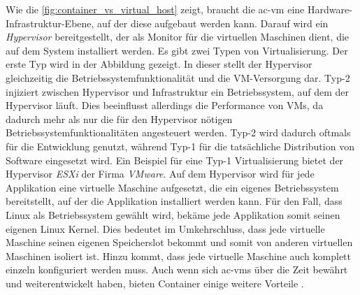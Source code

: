 Wie die \autoref{fig:container_vs_virtual_host} zeigt, braucht die \gls{ac-vm} eine Hardware-Infrastruktur-Ebene, auf der diese aufgebaut werden kann. Darauf wird ein \emph{Hypervisor} bereitgestellt, der als Monitor für die virtuellen Maschinen dient, die auf dem System installiert werden. Es gibt zwei Typen von Virtualisierung. Der erste Typ wird in der Abbildung gezeigt. In dieser stellt der Hypervisor gleichzeitig die Betriebssystemfunktionalität und die VM-Versorgung dar. Typ-2 injiziert zwischen Hypervisor und Infrastruktur ein Betriebssystem, auf dem der Hypervisor läuft. Dies beeinflusst allerdings die Performance von VMs, da dadurch mehr als nur die für den Hypervisor nötigen Betriebssystemfunktionalitäten angesteuert werden. Typ-2 wird dadurch oftmals für die Entwicklung genutzt, während Typ-1 für die tatsächliche Distribution von Software eingesetzt wird. Ein Beispiel für eine Typ-1 Virtualisierung bietet der Hypervisor \emph{ESXi} der Firma \emph{VMware}. Auf dem Hypervisor wird für jede Applikation eine virtuelle Maschine aufgesetzt, die ein eigenes Betriebssystem bereitstellt, auf der die Applikation installiert werden kann. Für den Fall, dass Linux als Betriebssystem gewählt wird, bekäme jede Applikation somit seinen eigenen Linux Kernel. Dies bedeutet im Umkehrschluss, dass jede virtuelle Maschine seinen eigenen Speicherslot bekommt und somit von anderen virtuellen Maschinen isoliert ist. Hinzu kommt, dass jede virtuelle Maschine auch komplett einzeln konfiguriert werden muss. Auch wenn sich \gls{ac-vm}s über die Zeit bewährt und weiterentwickelt haben, bieten Container einige weitere Vorteile \parencites{chelladhurai2017learning}{kane2018docker}.

